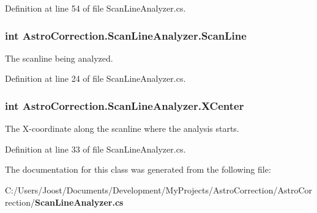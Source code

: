 Definition at line 54 of file ScanLineAnalyzer.cs.
\subsubsection[{ScanLine}]{\setlength{\rightskip}{0pt plus 5cm}int AstroCorrection.ScanLineAnalyzer.ScanLine\hspace{0.3cm}{\ttfamily  [get, set]}}\label{class_astro_correction_1_1_scan_line_analyzer_a24a61483196c3193cb5ee42141139471}


The scanline being analyzed. 

Definition at line 24 of file ScanLineAnalyzer.cs.
\subsubsection[{XCenter}]{\setlength{\rightskip}{0pt plus 5cm}int AstroCorrection.ScanLineAnalyzer.XCenter\hspace{0.3cm}{\ttfamily  [get, set]}}\label{class_astro_correction_1_1_scan_line_analyzer_ab54b1a23763c388577b1f07cbfb0c07d}


The X-\/coordinate along the scanline where the analysis starts. 

Definition at line 33 of file ScanLineAnalyzer.cs.

The documentation for this class was generated from the following file:\begin{DoxyCompactItemize}
\item 
C:/Users/Joost/Documents/Development/MyProjects/AstroCorrection/AstroCorrection/{\bf ScanLineAnalyzer.cs}\end{DoxyCompactItemize}
